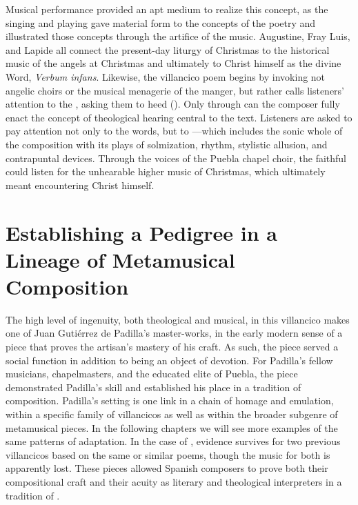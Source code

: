 Musical performance provided an apt medium to realize this concept, as the
singing and playing gave material form to the concepts of the poetry and
illustrated those concepts through the artifice of the music.
Augustine, Fray Luis, and Lapide all connect the present-day liturgy of
Christmas to the historical music of the angels at Christmas and ultimately to
Christ himself as the divine Word, \emph{Verbum infans}.
Likewise, the villancico poem begins by invoking not angelic choirs or the
musical menagerie of the manger, but rather calls listeners' attention to the
, asking them to heed 
().
Only through  can the composer fully enact
the concept of theological hearing central to the text.
Listeners are asked to pay attention not only to the words, but to ---which includes the sonic whole of the composition with its plays of
solmization, rhythm, stylistic allusion, and contrapuntal devices.
Through the voices of the Puebla chapel choir, the faithful could listen for the
unhearable higher music of Christmas, which ultimately meant encountering Christ
himself.

\section{Establishing a Pedigree in a Lineage of Metamusical Composition}

The high level of ingenuity, both theological and musical, in this villancico
makes  one of Juan Gutiérrez de Padilla's
master-works, in the early modern sense of a piece that proves the artisan's
mastery of his craft.
As such, the piece served a social function in addition to being an object of
devotion.
For Padilla's fellow musicians, chapelmasters, and the educated elite of Puebla,
the piece demonstrated Padilla's skill and established his place in a tradition
of composition.
Padilla's setting is one link in a chain of homage and emulation, within a
specific family of villancicos as well as within the broader subgenre of
metamusical pieces.
In the following chapters we will see more examples of the same patterns of
adaptation.
In the case of , evidence survives for two
previous villancicos based on the same or similar poems, though the music for
both is apparently lost.
These pieces allowed Spanish composers to prove both their compositional craft
and their acuity as literary and theological interpreters in a tradition of
.

